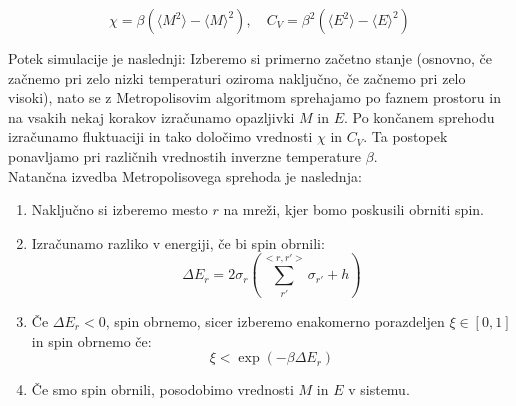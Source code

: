 \documentclass[a4paper]{article}
\newcommand{\s}{\sigma}
\newcommand{\expected}[1]{\langle #1 \rangle}
\newcommand{\D}{\Delta}
\begin{document}
    \begin{equation}\label{eq5}
        \chi = \beta (\expected{M^2} - \expected{M}^2), \quad C_V = \beta^2(\expected{E^2} - \expected{E}^2)
    \end{equation}

    Potek simulacije je naslednji: Izberemo si primerno začetno stanje (osnovno, če začnemo pri
    zelo nizki temperaturi oziroma naključno, če začnemo pri zelo visoki), nato se z Metropolisovim algoritmom
    sprehajamo po faznem prostoru in na vsakih nekaj korakov izračunamo opazljivki $M$ in $E$.
    Po končanem sprehodu izračunamo fluktuaciji in tako določimo vrednosti $\chi$ in $C_V$.
    Ta postopek ponavljamo pri različnih vrednostih inverzne temperature $\beta$. \\

    Natančna izvedba Metropolisovega sprehoda je naslednja:

    \begin{enumerate}
        \item Naključno si izberemo mesto $r$ na mreži, kjer bomo poskusili obrniti spin.

        \item Izračunamo razliko v energiji, če bi spin obrnili:
        \begin{equation}\label{eq6}
        \D E_r = 2\s_r \left( \sum_{r'}^{<r, r'>} \s_{r'} + h \right)
        \end{equation}

        \item Če $\D E_r < 0$, spin obrnemo, sicer izberemo enakomerno porazdeljen $\xi \in [0, 1]$ in spin obrnemo če:
        \begin{equation}\label{eq7}
            \xi < \exp(-\beta \D E_r)
        \end{equation}

        \item Če smo spin obrnili, posodobimo vrednosti $M$ in $E$ v sistemu.

    \end{enumerate}

    \iffalse
    \begin{figure}
        \centering
        \texttt{[image: slika16.pdf]}
        \caption{Odvisnost toka $J$ med termostatom in verigo v odvisnosti od časa vzorčenja $\tau$.
        Računano je na anharmonski ($\lambda = 1$) verigi dolžine $N = 10$ in povprečeno po $1000$ vzorcih.
        $J_1$ se nanaša na tok na levi, $J_2$ pa na desni strani verige.}
        \label{slika6}
    \end{figure}
    \fi
\end{document}
